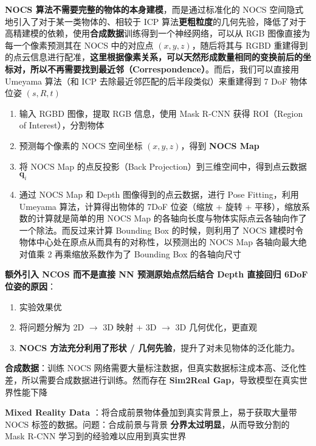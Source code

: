 \documentclass[
  8pt]{extarticle}
\providecommand{\tightlist}{%
  \setlength{\itemsep}{0pt}\setlength{\parskip}{0pt}}
\begin{document}
\begin{multicols*}{4}
\textbf{NOCS 算法不需要完整的物体的本身建模}，而是通过标准化的 NOCS
空间隐式地引入了对于某一类物体的、相较于 ICP
算法\textbf{更粗粒度}的几何先验，降低了对于高精建模的依赖，使用\textbf{合成数据}训练得到一个神经网络，可以从
RGB 图像直接为每一个像素预测其在 NOCS 中的对应点 \((x,y,z)\)，随后将其与
RGBD
重建得到的点云信息进行配准，\textbf{这里根据像素关系，可以天然形成数量相同的变换前后的坐标对，所以不再需要找到最近邻（Correspondence）}。而后，我们可以直接用
Umeyama 算法（和 ICP 去除最近邻匹配的后半段类似）来重建得到 7 DoF
物体位姿 \((s,R,t)\)

\begin{enumerate}
\def\labelenumi{\arabic{enumi}.}
\tightlist
\item
  输入 RGBD 图像，提取 RGB 信息，使用 Mask R-CNN 获得 ROI（Region of
  Interest），分割物体
\item
  预测每个像素的 NOCS 空间坐标 \((x,y,z)\)，得到 \textbf{NOCS Map}
\item
  将 NOCS Map 的点反投影（Back Projection）到三维空间中，得到点云数据
  \(\mathbf{q}_i\)
\item
  通过 NOCS Map 和 Depth 图像得到的点云数据，进行 Pose Fitting，利用
  Umeyama 算法，计算得出物体的 7DoF 位姿（缩放 + 旋转 +
  平移），缩放系数的计算就是简单的用 NOCS Map
  的各轴向长度与物体实际点云各轴向作了一个除法。而反过来计算 Bounding
  Box 的时候，则利用了 NOCS
  建模时令物体中心处在原点从而具有的对称性，以预测出的 NOCS Map
  各轴向最大绝对值乘 2 再乘缩放系数作为了 Bounding Box 的各轴向尺寸
\end{enumerate}

\textbf{额外引入 NCOS 而不是直接 NN 预测原始点然后结合 Depth 直接回归
6DoF 位姿的原因}：

\begin{enumerate}
\def\labelenumi{\arabic{enumi}.}
\tightlist
\item
  实验效果优
\item
  将问题分解为 2D \(\to\) 3D 映射 + 3D \(\to\) 3D 几何优化，更直观
\item
  \textbf{NOCS 方法充分利用了形状 /
  几何先验}，提升了对未见物体的泛化能力。
\end{enumerate}

\textbf{合成数据}：训练 NOCS
网络需要大量标注数据，但真实数据标注成本高、泛化性差，所以需要合成数据进行训练。然而存在
\textbf{Sim2Real Gap}，导致模型在真实世界性能下降

\textbf{Mixed Reality Data}
：将合成前景物体叠加到真实背景上，易于获取大量带 NOCS
标签的数据。问题：合成前景与背景 \textbf{分界太过明显}，从而导致分割的
Mask R-CNN 学习到的经验难以应用到真实世界


\end{multicols*}
\end{document}
